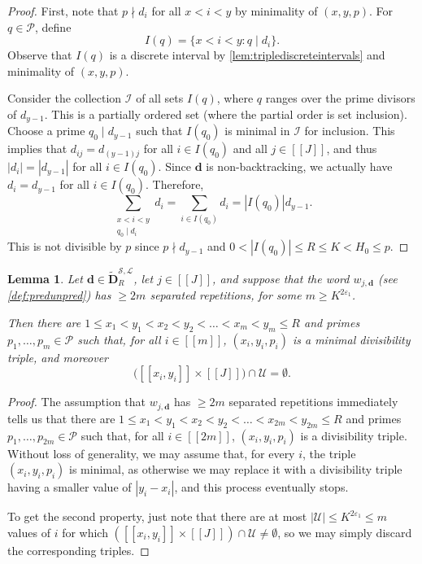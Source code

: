 \documentclass[11pt]{amsart}
\newtheorem{lemma}[theorem]{Lemma}
\theoremstyle{definition}
\renewcommand{\leq}{\leqslant}
\renewcommand{\geq}{\geqslant}
\newcommand{\interval}[2]{[\![#1,#2]\!] }
\newcommand{\sinterval}[1]{[\![#1]\!] }
\newcommand{\abs}[1]{\left|#1\right|}
\newcommand{\eps}{\varepsilon}
\newcommand{\primes}{\mathcal{P}}
\renewcommand{\d}{\boldsymbol{d}}
\newcommand{\pcomp}[2]{d_{#1#2}}
\newcommand{\cstU}{2\eps_1}
\newcommand{\lit}{\mathcal{L}}
\newcommand{\unlit}{\mathcal{U}}
\newcommand{\s}{\mathcal{S}}
\newcommand{\fancyD}{\mathbf{D}}
\newcommand{\Dnb}{\widetilde{\fancyD}^{\s,\lit}_{\!\tupsize}}
\newcommand{\repK}{K}
\newcommand{\newR}{\sinterval{J}}
\newcommand{\mm}{m}
\newcommand{\tupsize}{R}
\newcommand{\thisx}{x}
\newcommand{\thisy}{y}
\begin{document}
\begin{proof}
First, note that $p\nmid d_{i}$ for all $\thisx<i<\thisy$ by minimality of $(\thisx,\thisy,p)$. For $q\in \primes$, define 
\begin{equation*}
	I(q) = \{\thisx<i<\thisy : q\mid d_i\}.
\end{equation*}
Observe that $I(q)$ is a discrete interval by \cref{lem:triplediscreteintervals} and minimality of $(\thisx,\thisy,p)$. 

Consider the collection $\mathcal{I}$ of all sets $I(q)$, where $q$ ranges over the prime divisors of $d_{\thisy-1}$. This is a partially ordered set (where the partial order is set inclusion). Choose a prime $q_0\mid d_{\thisy-1}$ such that $I(q_0)$ is minimal in $\mathcal{I}$ for inclusion. This implies that $\pcomp{i}{j} = \pcomp{(\thisy-1)}{j}$ for all $i\in I(q_0)$ and all $j\in \newR$, and thus $|{d_i}| = |{d_{\thisy-1}}|$ for all $i\in I(q_0)$. Since $\d$ is non-backtracking, we actually have ${d_i} = {d_{\thisy-1}}$ for all $i\in I(q_0)$. Therefore,
\begin{equation*}
	\sum_{\substack{\thisx<i<\thisy\\ q_0\mid d_i}} d_{i} = \sum_{i\in I(q_0)} d_{i} = \abs{I(q_0)} d_{\thisy-1}.
\end{equation*}
This is not divisible by $p$ since $p\nmid d_{\thisy-1}$ and $0<\abs{I(q_0)} \leq \tupsize \leq K < H_0 \leq p$.
\end{proof}


\begin{lemma}
\label{lem:seprepstep1}
Let $\d \in \Dnb$, let $j\in \newR$, and suppose that the word $w_{j,\d}$ (see \cref{def:predunpred}) has $\geq 2\mm$ separated repetitions, for some $\mm \geq \repK^{\cstU}$.

Then there are $1\leq \thisx_1<\thisy_1<\thisx_2<\thisy_2<\ldots <\thisx_\mm<\thisy_\mm \leq \tupsize$ and primes $p_1, \ldots, p_\mm\in \primes$ such that, for all $i\in \sinterval{\mm}$, $(\thisx_i,\thisy_i,p_i)$ is a minimal divisibility triple, and moreover
\begin{equation*}
	\big(\interval{\thisx_i}{\thisy_i} \times \newR\big) \cap \unlit = \emptyset.
\end{equation*}
\end{lemma}
\begin{proof}
The assumption that $w_{j,\d}$ has $\geq 2\mm$ separated repetitions immediately tells us that there are $1\leq \thisx_1<\thisy_1<\thisx_2<\thisy_2<\ldots <\thisx_{2\mm}<\thisy_{2\mm} \leq \tupsize$ and primes $p_1, \ldots, p_{2\mm}\in \primes$ such that, for all $i\in \sinterval{2\mm}$, $(\thisx_i,\thisy_i,p_i)$ is a divisibility triple. Without loss of generality, we may assume that, for every $i$, the triple $(\thisx_i,\thisy_i,p_i)$ is minimal, as otherwise we may replace it with a divisibility triple having a smaller value of $\abs{\thisy_i-\thisx_i}$, and this process eventually stops.

To get the second property, just note that there are at most $|\unlit| \leq\repK^{\cstU} \leq \mm$ values of $i$ for which ${(\interval{\thisx_i}{\thisy_i} \times \newR) \cap \unlit \neq \emptyset}$, so we may simply discard the corresponding triples.
\end{proof}
\end{document}
